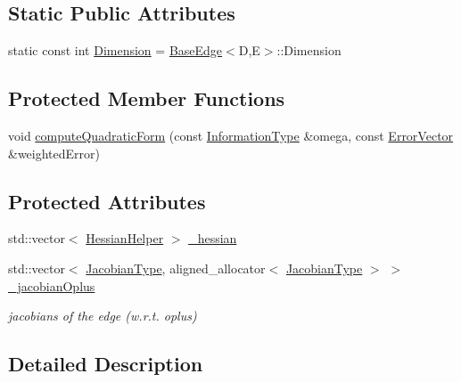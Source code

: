 \subsection*{Static Public Attributes}
\begin{DoxyCompactItemize}
\item 
static const int \mbox{\hyperlink{classg2o_1_1_base_multi_edge_a3c713fe8d1cd161f777625d8e2d5695d}{Dimension}} = \mbox{\hyperlink{classg2o_1_1_base_edge}{Base\+Edge}}$<$D,E$>$\+::Dimension
\end{DoxyCompactItemize}
\subsection*{Protected Member Functions}
\begin{DoxyCompactItemize}
\item 
void \mbox{\hyperlink{classg2o_1_1_base_multi_edge_ac260b65c12f6594165af680f815ac291}{compute\+Quadratic\+Form}} (const \mbox{\hyperlink{classg2o_1_1_base_edge_a2e5a33343ac3f189d8a7d5ee4d8b73fc}{Information\+Type}} \&omega, const \mbox{\hyperlink{classg2o_1_1_base_edge_af5b558dd24e4be2e437563cae4b3550d}{Error\+Vector}} \&weighted\+Error)
\end{DoxyCompactItemize}
\subsection*{Protected Attributes}
\begin{DoxyCompactItemize}
\item 
std\+::vector$<$ \mbox{\hyperlink{structg2o_1_1_base_multi_edge_1_1_hessian_helper}{Hessian\+Helper}} $>$ \mbox{\hyperlink{classg2o_1_1_base_multi_edge_af927d6f41bf73fc3b928cae2d6219d9e}{\+\_\+hessian}}
\item 
std\+::vector$<$ \mbox{\hyperlink{classg2o_1_1_base_multi_edge_a43dfdf5b27df296a32ee5a11f0653d55}{Jacobian\+Type}}, aligned\+\_\+allocator$<$ \mbox{\hyperlink{classg2o_1_1_base_multi_edge_a43dfdf5b27df296a32ee5a11f0653d55}{Jacobian\+Type}} $>$ $>$ \mbox{\hyperlink{classg2o_1_1_base_multi_edge_a00f8130e287bc945a8436375c4d07a02}{\+\_\+jacobian\+Oplus}}
\begin{DoxyCompactList}\small\item\em jacobians of the edge (w.\+r.\+t. oplus) \end{DoxyCompactList}\end{DoxyCompactItemize}


\subsection{Detailed Description}
